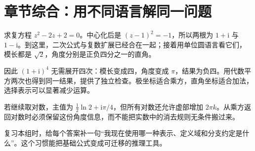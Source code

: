 \section*{章节综合：用不同语言解同一问题}
求复方程 $z^2-2z+2=0$。中心化后是 $(z-1)^2=-1$，所以两根为 $1+\mathrm i$ 与 $1-\mathrm i$。到这里，二次公式与复数扩展已经合在一起；接着用单位圆语言看它们，模长都是 $\sqrt2$，角度分别是正负四分之一的直角。

因此 $(1+\mathrm i)^4$ 无需展开四次：模长变成四，角度变成 $\pi$，结果为负四。用代数平方两次也得到同一结果，提供了独立检查。极坐标适合乘方，直角坐标适合加法，选择表示可以显著减少运算。

若继续取对数，主值为 $\frac12\ln2+\mathrm i\pi/4$，但所有对数还允许虚部增加 $2\pi k$。从乘方返回对数时必须保留这份角度信息，而不能把实数中的消去规则无条件搬过来。

复习本组时，给每个答案补一句“我现在使用哪一种表示、定义域和分支约定是什么”。这个习惯能把基础公式变成可迁移的推理工具。
